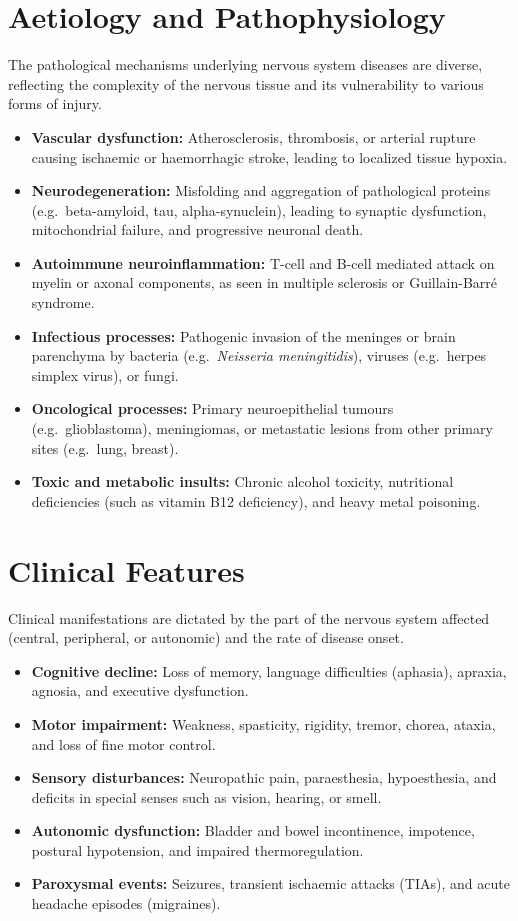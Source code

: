 \section*{Aetiology and Pathophysiology}
The pathological mechanisms underlying nervous system diseases are diverse, reflecting the complexity of the nervous tissue and its vulnerability to various forms of injury.
\begin{itemize}
    \item \textbf{Vascular dysfunction:} Atherosclerosis, thrombosis, or arterial rupture causing ischaemic or haemorrhagic stroke, leading to localized tissue hypoxia.
    \item \textbf{Neurodegeneration:} Misfolding and aggregation of pathological proteins (e.g.\ beta-amyloid, tau, alpha-synuclein), leading to synaptic dysfunction, mitochondrial failure, and progressive neuronal death.
    \item \textbf{Autoimmune neuroinflammation:} T-cell and B-cell mediated attack on myelin or axonal components, as seen in multiple sclerosis or Guillain-Barré syndrome.
    \item \textbf{Infectious processes:} Pathogenic invasion of the meninges or brain parenchyma by bacteria (e.g.\ \textit{Neisseria meningitidis}), viruses (e.g.\ herpes simplex virus), or fungi.
    \item \textbf{Oncological processes:} Primary neuroepithelial tumours (e.g.\ glioblastoma), meningiomas, or metastatic lesions from other primary sites (e.g.\ lung, breast).
    \item \textbf{Toxic and metabolic insults:} Chronic alcohol toxicity, nutritional deficiencies (such as vitamin B12 deficiency), and heavy metal poisoning.
\end{itemize}

\section*{Clinical Features}
Clinical manifestations are dictated by the part of the nervous system affected (central, peripheral, or autonomic) and the rate of disease onset.
\begin{itemize}
    \item \textbf{Cognitive decline:} Loss of memory, language difficulties (aphasia), apraxia, agnosia, and executive dysfunction.
    \item \textbf{Motor impairment:} Weakness, spasticity, rigidity, tremor, chorea, ataxia, and loss of fine motor control.
    \item \textbf{Sensory disturbances:} Neuropathic pain, paraesthesia, hypoesthesia, and deficits in special senses such as vision, hearing, or smell.
    \item \textbf{Autonomic dysfunction:} Bladder and bowel incontinence, impotence, postural hypotension, and impaired thermoregulation.
    \item \textbf{Paroxysmal events:} Seizures, transient ischaemic attacks (TIAs), and acute headache episodes (migraines).
\end{itemize}

